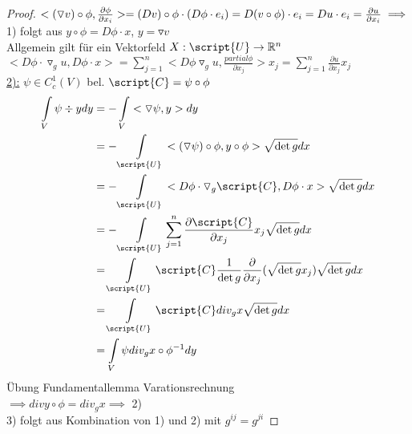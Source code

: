   \begin{proof}
    $< (\triangledown v) \circ \phi, \frac{\partial \phi}{\partial x_i} > = (Dv) \circ \phi \cdot (D\phi \cdot e_i) = D(v\circ \phi) \cdot e_i = Du \cdot e_i = \frac{\partial u}{\partial x_i} \\
    \implies$ 1) folgt aus $y\circ \phi = D\phi \cdot x$, $y = \triangledown v$ \\
    Allgemein gilt für ein Vektorfeld $X: \script{U} \to \mathbb{R}^n$ \\
    $<D\phi \cdot \triangledown_g u, D\phi\cdot x > = \sum\limits_{j=1}^n < D\phi \triangledown_gu, \frac{partial \phi}{\partial x_j} > x_j = \sum\limits_{j=1}^n \frac{\partial u}{\partial x_j} x_j$ \\
    \underline{2):}  $\psi \in C^1_c(V)$ bel. $\script{C} = \psi\circ\phi$ \\
    \begin{align*}
    	\int\limits_V \psi \div{y}dy &= -\int\limits_V <\triangledown \psi, y > dy \\
    	&= -\int\limits_{\script{U}} <(\triangledown \psi)\circ \phi, y\circ\phi > \sqrt{\det{g}} dx \\
    	&= -\int\limits_{\script{U}} < D\phi \cdot \triangledown_g\script{C}, D\phi\cdot x > \sqrt{\det{g}} dx \\
       &= -\int\limits_{\script{U}} \sum\limits_{j=1}^n \frac{\partial \script{C}}{\partial x_j} x_j \sqrt{\det{g}} dx \\
       &= \int\limits_{\script{U}} \script{C} \frac{1}{\det{g}} \frac{\partial}{\partial x_j} (\sqrt{\det{g}}x_j) \sqrt{\det{g}} dx \\
       &= \int\limits_{\script{U}} \script{C} div_g x \sqrt{\det{g}} dx \\
       &= \int\limits_V \psi div_g x\circ \phi^{-1} dy 
       \end{align*}
   	Übung Fundamentallemma Varationsrechnung \\
   	$\implies div{y\circ\phi} = div_g x \implies$ 2) \\
   	3) folgt aus Kombination von 1) und 2) mit $g^{ij} = g^{ji}$
  \end{proof}

